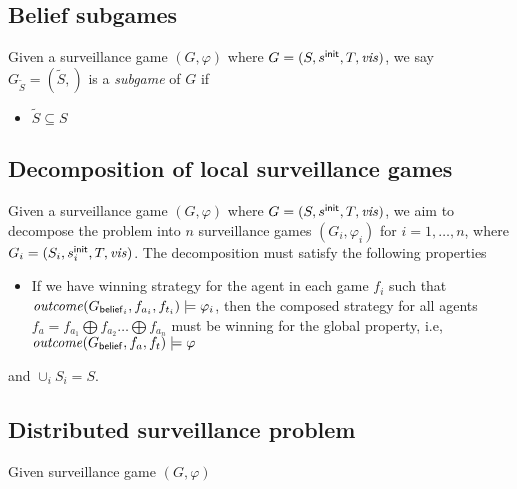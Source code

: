 \subsection{Belief subgames}
Given a surveillance game $(G,\varphi)$ where $G = (S,s^{\mathsf{init}},T,\mathit{vis})$, we say $G_{\tilde{S}} = (\tilde{S},)$ is a \emph{subgame} of $G$ if 
\begin{itemize}
\item $\tilde{S} \subseteq S$
\end{itemize}

\subsection{Decomposition of local surveillance games}
Given a surveillance game $(G,\varphi)$ where $G = (S,s^{\mathsf{init}},T,\mathit{vis})$, we aim to decompose the problem into $n$ surveillance games $(G_i,\varphi_i)$ for $i = 1,\dots,n$, where $G_i = (S_i,s^{\mathsf{init}}_i,T,\mathit{vis})$. The decomposition must satisfy the following properties
\begin{itemize}
\item If we have winning strategy for the agent in each game $f_i$ such that $\mathit{outcome}(G_{\mathsf{belief}_i},f_{a_i},f_{t_i}) \models \varphi_i$, then the composed strategy for all agents $f_a = f_{a_1} \bigoplus f_{a_2} \dots \bigoplus f_{a_n}$ must be winning for the global property, i.e, $\mathit{outcome}(G_{\mathsf{belief}},f_{a},f_{t}) \models \varphi$
\end{itemize}


and $\cup_iS_i = S$. 



\subsection{Distributed surveillance problem}



Given surveillance game  $(G,\varphi)$